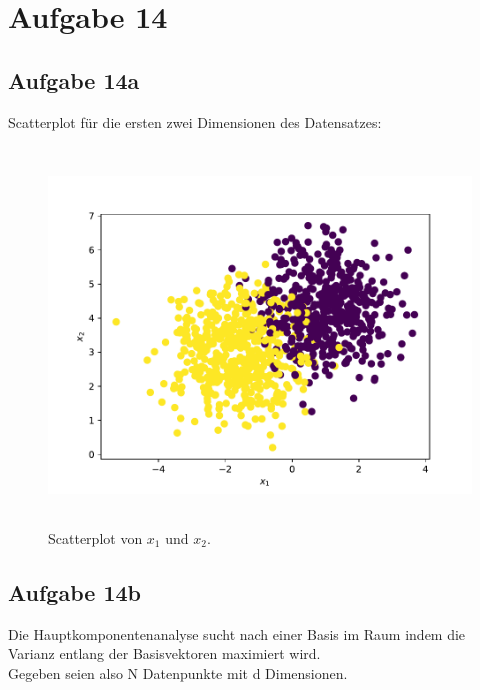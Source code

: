   \section{Aufgabe 14}
    \subsection{Aufgabe 14a}
    Scatterplot für die ersten zwei Dimensionen des Datensatzes:
    \begin{figure}[H]
      \centering
      \includegraphics[height=10cm]{a_scatter.pdf}
      \caption{Scatterplot von $x_1$ und $x_2$.}
      \label{fig:ascatter}
    \end{figure}

    \subsection{Aufgabe 14b}
    Die Hauptkomponentenanalyse sucht nach einer Basis im Raum indem die Varianz entlang der Basisvektoren maximiert wird.\\
    Gegeben seien also N
    Datenpunkte mit d Dimensionen.

